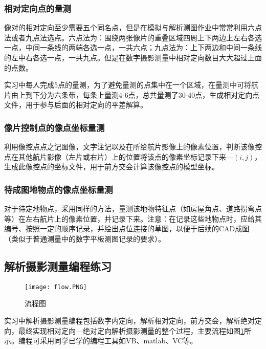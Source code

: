 \subsubsection{相对定向点的量测}

像对的相对定向至少需要五个同名点，但是在模拟与解析测图作业中常常利用六点法或者九点法选点。六点法为：围绕两张像片的重叠区域四周上下两边上左右各选一点，中间一条线的两端各选一点，一共六点；九点法为：上下两边和中间一条线的左中右各选一点，一共九点。但是在数字摄影测量中相对定向数目大大超过上面的点数。

实习中每人完成5点的量测，为了避免量测的点集中在一个区域，在量测中可将航片由上到下分为六条带，每条上量测4-6点，总共量测了30-40点，生成相对定向点文件，用于参与后面的相对定向的平差解算。

\subsubsection{像片控制点的像点坐标量测}

利用像控点点之记图像，文字注记以及在所给航片影像上的像素位置，判断该像控点在其他航片影像（左片或右片）上的位置将该点的像素坐标记录下来---$(i,j)$，生成此像控点的坐标文件，用于前方交会计算该像控点的模型坐标。

\subsubsection{待成图地物点的像点坐标量测}

对于待定地物点，采用同样的方法，量测该地物特征点（如房屋角点、道路拐弯点等）在左右航片上的像素位置，并记录下来。注意：在记录这些地物点时，应给其编号、按照一定的顺序记录，并绘出点位连接的草图，以便于后续的CAD成图（类似于普通测量中的数字平板测图记录的要求）。

\subsection{解析摄影测量编程练习}
\label{sub:biancheng}

\begin{figure}[htbp]
\centering
\caption{流程图}
\texttt{[image: flow.PNG]}
\label{fig:22}
\end{figure}

实习中解析摄影测量编程包括数字内定向，解析相对定向，前方交会，解析绝对定向，最终实现相对定向---绝对定向解析摄影测量的整个过程，主要流程如图\ref{fig:22}所示。编程可采用同学已学的编程工具如VB、matlab、VC等。



